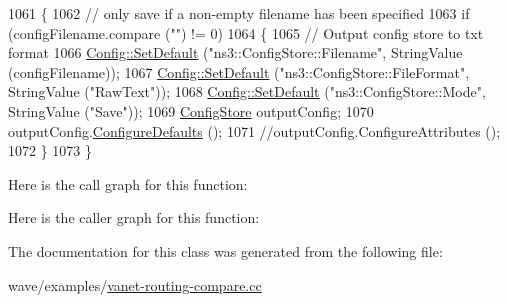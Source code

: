 \begin{DoxyCode}
1061 \{
1062   \textcolor{comment}{// only save if a non-empty filename has been specified}
1063   \textcolor{keywordflow}{if} (configFilename.compare (\textcolor{stringliteral}{""}) != 0)
1064     \{
1065       \textcolor{comment}{// Output config store to txt format}
1066       \hyperlink{group__config_ga2e7882df849d8ba4aaad31c934c40c06}{Config::SetDefault} (\textcolor{stringliteral}{"ns3::ConfigStore::Filename"}, StringValue (configFilename));
1067       \hyperlink{group__config_ga2e7882df849d8ba4aaad31c934c40c06}{Config::SetDefault} (\textcolor{stringliteral}{"ns3::ConfigStore::FileFormat"}, StringValue (\textcolor{stringliteral}{"RawText"}));
1068       \hyperlink{group__config_ga2e7882df849d8ba4aaad31c934c40c06}{Config::SetDefault} (\textcolor{stringliteral}{"ns3::ConfigStore::Mode"}, StringValue (\textcolor{stringliteral}{"Save"}));
1069       \hyperlink{classns3_1_1ConfigStore}{ConfigStore} outputConfig;
1070       outputConfig.\hyperlink{classns3_1_1ConfigStore_a0a6137574d7c847c3823af8b9d1bb886}{ConfigureDefaults} ();
1071       \textcolor{comment}{//outputConfig.ConfigureAttributes ();}
1072     \}
1073 \}
\end{DoxyCode}


Here is the call graph for this function\+:




Here is the caller graph for this function\+:




The documentation for this class was generated from the following file\+:\begin{DoxyCompactItemize}
\item 
wave/examples/\hyperlink{vanet-routing-compare_8cc}{vanet-\/routing-\/compare.\+cc}\end{DoxyCompactItemize}
